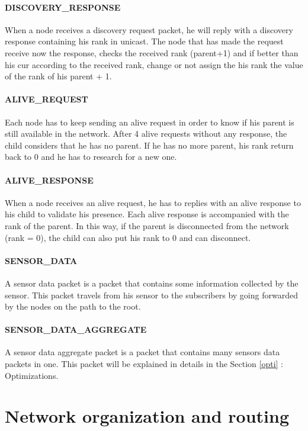 \documentclass[a4paper,10pt]{article}
\begin{document}
\paragraph{DISCOVERY\_RESPONSE} When a node receives a discovery request packet, he will reply with a discovery response containing his rank in unicast. The node that has made the request receive now the response, checks the received rank (parent+1) and if better than his cur according to the received rank, change or not assign the his rank the value of the rank of his parent + 1.

\paragraph{ALIVE\_REQUEST} Each node has to keep sending an alive request in order to know if his parent is still available in the network. After 4 alive requests without any response, the child considers that he has no parent. If he has no more parent, his rank return back to 0 and he has to research for a new one. 

\paragraph{ALIVE\_RESPONSE } When a node receives an alive request, he has to replies with an alive response to his child to validate his presence. Each alive response is accompanied with the rank of the parent. In this way, if the parent is disconnected from the network (rank = 0), the child can also put his rank to 0 and can disconnect. 

\paragraph{SENSOR\_DATA } A sensor data packet is a packet that contains some information collected by the sensor. This packet travels from his sensor to the subscribers by going forwarded by the nodes on the path to the root.

\paragraph{SENSOR\_DATA\_AGGREGATE } A sensor data aggregate packet is a packet that contains many sensors data packets in one. This packet will be explained in details in the Section \ref{opti} : Optimizations.





\section{Network organization and routing}
\label{routing}
\end{document}
